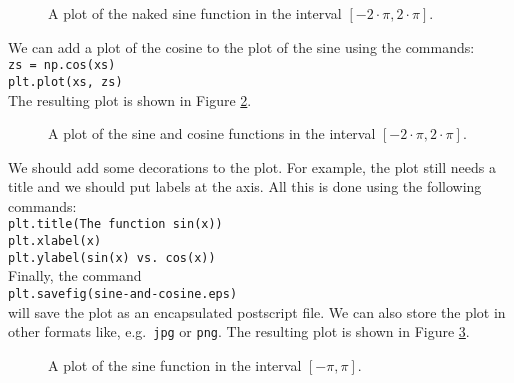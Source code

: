 \documentclass{report}
\begin{document}
\begin{figure}[!ht]
  \centering
  \caption{A plot of the naked sine function in the interval $[-2\cdot\pi, 2\cdot\pi]$.}
  \label{fig:naked-sine.eps}
\end{figure} 

We can add a plot of the cosine to the plot of the sine using the commands:
\\[0.2cm]
\hspace*{1.3cm}
\texttt{zs = np.cos(xs)}
\\[0.2cm]
\hspace*{1.3cm}
\texttt{plt.plot(xs, zs)}
\\[0.2cm]
The resulting plot is shown in Figure \ref{fig:naked-sine-and-cosine.eps}.

\begin{figure}[!ht]
  \centering
  \caption{A plot of the sine and cosine functions in the interval $[-2\cdot\pi, 2\cdot\pi]$.}
  \label{fig:naked-sine-and-cosine.eps}
\end{figure}


We should add some decorations to the plot.  For example, the plot still needs a title and we
should put labels at the axis.  All this is done using the following commands:
\\[0.2cm]
\hspace*{1.3cm}
\texttt{plt.title(The function sin(x))} \\
\hspace*{1.3cm} 
\texttt{plt.xlabel(x)} \\
\hspace*{1.3cm}
\texttt{plt.ylabel(sin(x) vs. cos(x))} 
\\[0.2cm]
Finally, the command
\\[0.2cm]
\hspace*{1.3cm}
\texttt{plt.savefig(sine-and-cosine.eps)}
\\[0.2cm]
will save the plot as an encapsulated postscript file.  We can also store the plot in other formats
like, e.g.~\texttt{jpg} or \texttt{png}.   The resulting plot is shown in Figure \ref{fig:sine-and-cosine.eps}.  

\begin{figure}[!ht]
  \centering
  \caption{A plot of the sine function in the interval $[-\pi, \pi]$.}
  \label{fig:sine-and-cosine.eps}
\end{figure}
\end{document}
